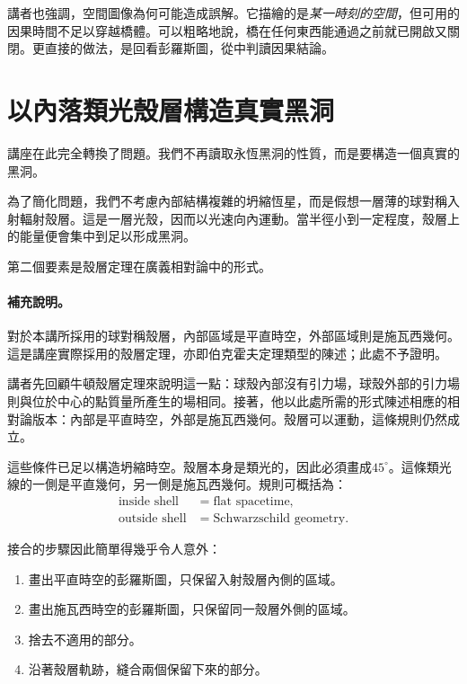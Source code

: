 講者也強調，空間圖像為何可能造成誤解。它描繪的是\emph{某一時刻的空間}，但可用的因果時間不足以穿越橋體。可以粗略地說，橋在任何東西能通過之前就已開啟又關閉。更直接的做法，是回看彭羅斯圖，從中判讀因果結論。

\section{以內落類光殼層構造真實黑洞}

講座在此完全轉換了問題。我們不再讀取永恆黑洞的性質，而是要構造一個真實的黑洞。

為了簡化問題，我們不考慮內部結構複雜的坍縮恆星，而是假想一層薄的球對稱入射輻射殼層。這是一層光殼，因而以光速向內運動。當半徑小到一定程度，殼層上的能量便會集中到足以形成黑洞。

第二個要素是殼層定理在廣義相對論中的形式。

\paragraph{補充說明。}對於本講所採用的球對稱殼層，內部區域是平直時空，外部區域則是施瓦西幾何。這是講座實際採用的殼層定理，亦即伯克霍夫定理類型的陳述；此處不予證明。

講者先回顧牛頓殼層定理來說明這一點：球殼內部沒有引力場，球殼外部的引力場則與位於中心的點質量所產生的場相同。接著，他以此處所需的形式陳述相應的相對論版本：內部是平直時空，外部是施瓦西幾何。殼層可以運動，這條規則仍然成立。

這些條件已足以構造坍縮時空。殼層本身是類光的，因此必須畫成\(45^\circ\)。這條類光線的一側是平直幾何，另一側是施瓦西幾何。規則可概括為：
\begin{equation}
\begin{aligned}
\text{inside shell} &= \text{flat spacetime},\\
\text{outside shell} &= \text{Schwarzschild geometry}.
\end{aligned}
\end{equation}

接合的步驟因此簡單得幾乎令人意外：

\begin{enumerate}
\item 畫出平直時空的彭羅斯圖，只保留入射殼層內側的區域。
\item 畫出施瓦西時空的彭羅斯圖，只保留同一殼層外側的區域。
\item 捨去不適用的部分。
\item 沿著殼層軌跡，縫合兩個保留下來的部分。
\end{enumerate}

